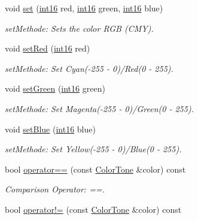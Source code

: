 \begin{DoxyCompactItemize}
void \hyperlink{class_f2_c_1_1_color_tone_a687200e3fcb535f53b37e6ed664ac1b9}{set} (\hyperlink{namespace_f2_c_ab83c1e14d784a7d520d770ca6fa8fd8e}{int16} red, \hyperlink{namespace_f2_c_ab83c1e14d784a7d520d770ca6fa8fd8e}{int16} green, \hyperlink{namespace_f2_c_ab83c1e14d784a7d520d770ca6fa8fd8e}{int16} blue)
\begin{DoxyCompactList}\small\item\em setMethode: Sets the color RGB (CMY). \item\end{DoxyCompactList}\item 
void \hyperlink{class_f2_c_1_1_color_tone_a269d5e83e4db3636641a72cd65763589}{setRed} (\hyperlink{namespace_f2_c_ab83c1e14d784a7d520d770ca6fa8fd8e}{int16} red)
\begin{DoxyCompactList}\small\item\em setMethode: Set Cyan(-\/255 -\/ 0)/Red(0 -\/ 255). \item\end{DoxyCompactList}\item 
void \hyperlink{class_f2_c_1_1_color_tone_a184ce7d0ea7b172138dea5fc6e5a1cdf}{setGreen} (\hyperlink{namespace_f2_c_ab83c1e14d784a7d520d770ca6fa8fd8e}{int16} green)
\begin{DoxyCompactList}\small\item\em setMethode: Set Magenta(-\/255 -\/ 0)/Green(0 -\/ 255). \item\end{DoxyCompactList}\item 
void \hyperlink{class_f2_c_1_1_color_tone_a6fb186c7fd68c103669f12ba4ee1fb00}{setBlue} (\hyperlink{namespace_f2_c_ab83c1e14d784a7d520d770ca6fa8fd8e}{int16} blue)
\begin{DoxyCompactList}\small\item\em setMethode: Set Yellow(-\/255 -\/ 0)/Blue(0 -\/ 255). \item\end{DoxyCompactList}\item 
\hypertarget{class_f2_c_1_1_color_tone_a7f40ca41a00b8cc9f93b72a28682278c}{
bool \hyperlink{class_f2_c_1_1_color_tone_a7f40ca41a00b8cc9f93b72a28682278c}{operator==} (const \hyperlink{class_f2_c_1_1_color_tone}{ColorTone} \&color) const }
\label{class_f2_c_1_1_color_tone_a7f40ca41a00b8cc9f93b72a28682278c}

\begin{DoxyCompactList}\small\item\em Comparison Operator: ==. \item\end{DoxyCompactList}\item 
\hypertarget{class_f2_c_1_1_color_tone_aef6521763ccb2e1cf912497afb8b8648}{
bool \hyperlink{class_f2_c_1_1_color_tone_aef6521763ccb2e1cf912497afb8b8648}{operator!=} (const \hyperlink{class_f2_c_1_1_color_tone}{ColorTone} \&color) const }
\label{class_f2_c_1_1_color_tone_aef6521763ccb2e1cf912497afb8b8648}


\end{DoxyCompactItemize}

